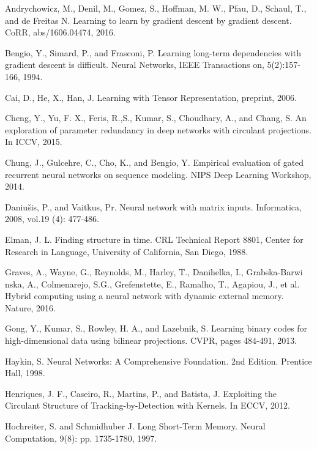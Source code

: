 \documentclass[a4paper,11pt]{article}
\begin{document}
\begin{thebibliography}{1}



 Andrychowicz, M.,  Denil, M., Gomez, S., Hoffman, M. W., Pfau, D., Schaul, T., and de Freitas N.  Learning to learn by gradient descent by gradient descent. CoRR, abs/1606.04474, 2016.

 Bengio,  Y.,  Simard,  P.,  and  Frasconi, P. Learning long-term dependencies with gradient descent is difficult. Neural Networks, IEEE Transactions on, 5(2):157-166, 1994.


 Cai, D., He, X., Han, J. Learning with Tensor Representation, preprint, 2006.

 Cheng, Y., Yu, F. X., Feris, R.,S., Kumar, S., Choudhary, A., and Chang, S.  An exploration of parameter redundancy in deep networks with circulant projections. In
ICCV, 2015.


 Chung, J., Gulcehre, C., Cho, K., and Bengio, Y. Empirical evaluation of gated recurrent neural networks on sequence modeling. NIPS Deep Learning Workshop, 2014.

 Daniu\v{s}is, P., and Vaitkus, Pr. Neural network with matrix inputs. Informatica, 2008, vol.19 (4): 477-486.


 Elman, J. L. Finding structure in time.  CRL Technical Report 8801, Center for Research in Language, University
of California, San Diego, 1988.

  Graves, A., Wayne, G., Reynolds, M.,  Harley, T., Danihelka, I., Grabska-Barwi
 nska, A., Colmenarejo, S.G., Grefenstette, E., Ramalho, T., Agapiou, J., et al. Hybrid computing using a neural network with dynamic external memory. Nature, 2016.
 


  Gong, Y., Kumar, S., Rowley, H. A., and Lazebnik, S. Learning binary codes for high-dimensional data using bilinear projections. CVPR, pages 484-491, 2013.



 Haykin, S. Neural Networks: A Comprehensive Foundation. 2nd Edition. Prentice Hall, 1998.


 Henriques,  J. F.,  Caseiro, R.,  Martins, P.,  and Batista, J.   Exploiting the Circulant Structure of Tracking-by-Detection with Kernels.   In ECCV, 2012.


 Hochreiter, S.  and  Schmidhuber J. Long  Short-Term  Memory. Neural  Computation, 9(8): pp. 1735-1780, 1997.



\end{thebibliography}
\end{document}
